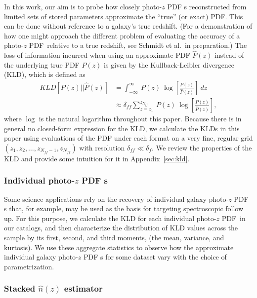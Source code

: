 \documentclass[\docopts]{\docclass}
\newcommand{\pz}{photo-$z$ PDF\xspace}
\begin{document}
In this work, our aim is to probe how
closely \pz s reconstructed from limited sets of stored parameters approximate the
``true'' (or exact) PDF. This can be done without reference to a galaxy's true redshift.
(For a demonstration
of how one might approach the different problem of evaluating the accuracy of a
\pz\ relative to a true redshift, see Schmidt et al.\ in preparation.)  The loss of information incurred when using an approximate PDF
$\hat{P}(z)$ instead of the underlying true PDF $P(z)$ is given by
the Kullback-Leibler divergence (KLD), which is defined as
\begin{align}
  \label{eq:kld}
  KLD[P(z) || \hat{P}(z)] &= \int_{-\infty}^{\infty}\ P(z)\
\log\left[\frac{P(z)}{\hat{P}(z)}\right]\ dz\\
  &\approx \delta_{ff}\sum_{z=z_{1}}^{z_{N_{ff}}}\ P(z)\
\log\left[\frac{P(z)}{\hat{P}(z)}\right],
\end{align}
where $\log$ is the natural logarithm throughout this paper.  Because there is
in general no closed-form expression for the KLD, we calculate the KLDs in this
paper using evaluations of the PDF under each format on a very fine, regular
grid $(z_{1}, z_{2}, \dots, z_{N_{ff}-1}, z_{N_{ff}})$ with resolution
$\delta_{ff}\ll\delta_{f}$.  We review the properties of the KLD and provide some
intuition for it in Appendix~\ref{sec:kld}.

\subsubsection{Individual \pz s}
\label{sec:individual_metric}

Some science applications rely on the recovery of individual galaxy \pz s that,
for example, may be used as the basis for targeting spectroscopic follow up.  For this purpose, we calculate the KLD
for each individual \pz\ in our catalogs, and then characterize the distribution of KLD values across the sample
by its first, second, and third moments, (the mean,
variance, and kurtosis).  We use these aggregate statistics to observe how the
approximate individual galaxy \pz s for some dataset vary with the choice of parametrization.


\subsubsection{Stacked $\hat{n}(z)$ estimator}
\label{sec:stacked_metric}
\end{document}
